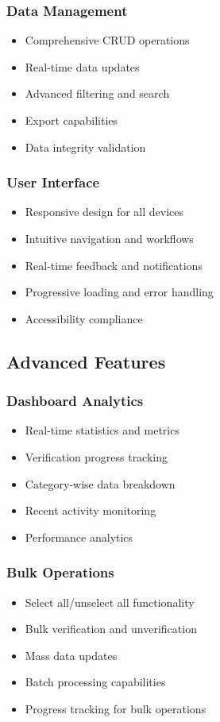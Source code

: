 \documentclass[12pt,a4paper]{article}
\begin{document}
\subsubsection{Data Management}
\begin{itemize}
    \item Comprehensive CRUD operations
    \item Real-time data updates
    \item Advanced filtering and search
    \item Export capabilities
    \item Data integrity validation
\end{itemize}

\subsubsection{User Interface}
\begin{itemize}
    \item Responsive design for all devices
    \item Intuitive navigation and workflows
    \item Real-time feedback and notifications
    \item Progressive loading and error handling
    \item Accessibility compliance
\end{itemize}

\subsection{Advanced Features}

\subsubsection{Dashboard Analytics}
\begin{itemize}
    \item Real-time statistics and metrics
    \item Verification progress tracking
    \item Category-wise data breakdown
    \item Recent activity monitoring
    \item Performance analytics
\end{itemize}

\subsubsection{Bulk Operations}
\begin{itemize}
    \item Select all/unselect all functionality
    \item Bulk verification and unverification
    \item Mass data updates
    \item Batch processing capabilities
    \item Progress tracking for bulk operations
\end{itemize}
\end{document}
